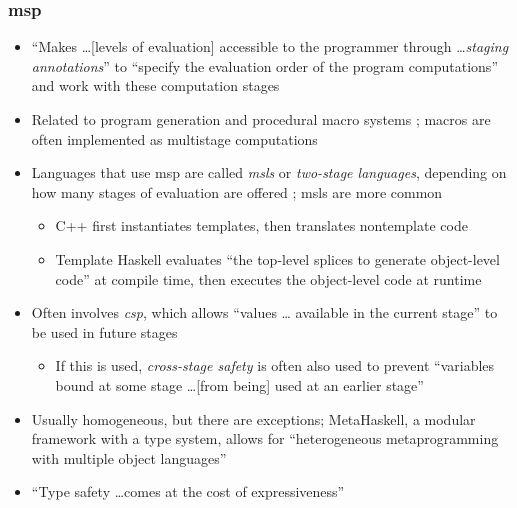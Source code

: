 \subsubsection{\acf{msp} \citep[p.~113:17-20]{lilis_survey_2019}}
\begin{itemize}
      \item ``Makes \dots [levels of evaluation] accessible to the programmer
            through \dots \emph{staging annotations}'' to ``specify the
            evaluation order of the program computations'' and work with these
            computation stages \citep[p.~113:17]{lilis_survey_2019}
      \item Related to program generation and procedural macro systems
            \citep[p.~113:17]{lilis_survey_2019}; macros are often implemented
            as multistage computations \citep[p.~113:18]{lilis_survey_2019}
      \item Languages that use \acs{msp} are called \emph{\acfp{msl}} or
            \emph{two-stage languages}, depending on how many stages of
            evaluation are offered \citep[p.~113:17]{lilis_survey_2019};
            \acsp{msl} are more common \citep[p.~113:31]{lilis_survey_2019}
            \begin{itemize}
                  \item C++ first instantiates templates, then translates
                        nontemplate code \citep[p.~113:19]{lilis_survey_2019}
                  \item Template Haskell evaluates ``the top-level splices
                        to generate object-level code'' at compile time, then
                        executes the object-level code at runtime
                        \citep[p.~113:19]{lilis_survey_2019}
            \end{itemize}
      \item Often involves \emph{\acf{csp}}, which allows ``values \dots
            available in the current stage'' to be used in future stages
            \citep[p.~113:17]{lilis_survey_2019}
            \begin{itemize}
                  \item If this is used, \emph{cross-stage safety} is often
                        also used to prevent ``variables bound at some stage
                        \dots [from being] used at an earlier stage''
                        \citep[p.~113:17]{lilis_survey_2019}
            \end{itemize}
      \item Usually homogeneous, but there are exceptions; MetaHaskell, a
            modular framework \citep[p.~113:19]{lilis_survey_2019} with a type
            system, allows for ``heterogeneous metaprogramming with multiple
            object languages'' \citep[p.~113:18]{lilis_survey_2019}
      \item ``Type safety \dots comes at the cost of expressiveness''
            \citep[p.~113:19]{lilis_survey_2019}
\end{itemize}

